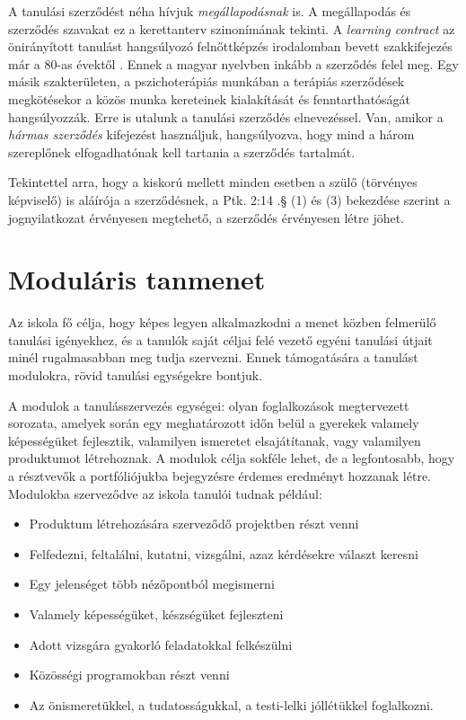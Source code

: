 A tanulási szerződést néha hívjuk \emph{megállapodásnak} is. A megállapodás és szerződés szavakat ez a kerettanterv szinonímának tekinti. A \emph{learn\-ing con\-tract} az önirányított tanulást hangsúlyozó felnőttképzés irodalomban
bevett szakkifejezés már a 80-as évektől \citep{Malcolm77}. Ennek a magyar nyelvben inkább a szerződés felel meg. Egy másik szakterületen, a pszichoterápiás munkában a terápiás szerződések megkötésekor a közös munka kereteinek kialakítását és fenntarthatóságát hangsúlyozzák. \citep{pszichoterapia} Erre is utalunk a tanulási szerződés elnevezéssel. Van, amikor a \emph{hármas szerződés} kifejezést használjuk, hangsúlyozva, hogy mind a három szereplőnek elfogadhatónak kell tartania a szerződés tartalmát.

Tekintettel arra, hogy a kiskorú mellett minden esetben a szülő (törvényes képviselő) is aláírója a szerződésnek, a Ptk. 2:14 .§ (1) és (3) bekezdése szerint a jognyilatkozat érvényesen megtehető, a szerződés érvényesen létre jöhet.

\section{Moduláris tanmenet}
\label{sec:modularis_tanmenet}

Az iskola fő célja, hogy képes legyen alkalmazkodni a menet közben felmerülő tanulási igényekhez, és a tanulók saját céljai felé vezető egyéni tanulási útjait minél rugalmasabban meg tudja szervezni. Ennek támogatására a tanulást modulokra, rövid tanulási egységekre bontjuk.

A modulok a tanulásszervezés egységei: olyan foglalkozások megtervezett sorozata, amelyek során egy meghatározott időn belül a gyerekek valamely képességüket fejlesztik, valamilyen ismeretet elsajátítanak, vagy valamilyen produktumot létrehoznak. A modulok célja sokféle lehet, de a legfontosabb, hogy a résztvevők a portfóliójukba bejegyzésre érdemes eredményt hozzanak létre. Modulokba szerveződve az iskola tanulói tudnak például:

\begin{itemize}
\item Produktum létrehozására szerveződő projektben részt venni
\item Felfedezni, feltalálni, kutatni, vizsgálni, azaz kérdésekre választ keresni
\item Egy jelenséget több nézőpontból megismerni
\item Valamely képességüket, készségüket fejleszteni
\item Adott vizsgára gyakorló feladatokkal felkészülni
\item Közösségi programokban részt venni
\item Az önismeretükkel, a tudatosságukkal, a testi-lelki jóllétükkel foglalkozni.
\end{itemize}


